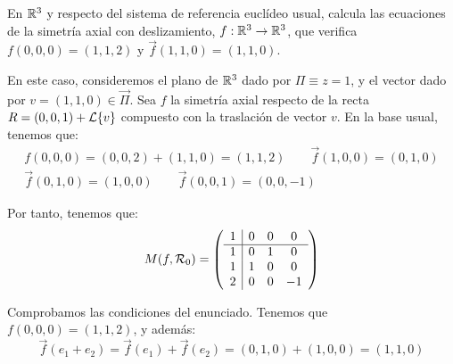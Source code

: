 \documentclass[12pt]{article}
\begin{document}
    \begin{ejercicio}[2.5 puntos] En $\mathbb{R}^3$ y respecto del sistema de referencia euclídeo usual, calcula las ecuaciones
        de la simetría axial con deslizamiento, $f:\mathbb{R}^3 \to \mathbb{R}^3$, que verifica $f(0,0,0)=(1,1,2)$ y $\vec{f}(1,1,0)=(1,1,0)$.

        En este caso, consideremos el plano de $\mathbb{R}^3$ dado por $\Pi\equiv z=1$, y el vector dado por $v=(1,1,0)\in \vec{\Pi}$.
        Sea $f$ la simetría axial respecto de la recta $R=(0,0,1) + \mathcal{L}\{v\}$ compuesto con la traslación de vector $v$.
        En la base usual, tenemos que:
        \begin{gather*}
            f(0,0,0)=(0,0,2) + (1,1,0) = (1,1,2) \qquad
            \vec{f}(1,0,0) = (0,1,0) \\
            \vec{f}(0,1,0) = (1,0,0) \qquad
            \vec{f}(0,0,1) = (0,0,-1)
        \end{gather*}

        Por tanto, tenemos que:
        \begin{equation*}
            M(f, \mathcal{R}_0) = \left(
                \begin{array}{c|ccc}
                    1 & 0 & 0 & 0 \\
                    \hline
                    1 & 0 & 1 & 0 \\
                    1 & 1 & 0 & 0 \\
                    2 & 0 & 0 & -1
                \end{array}
            \right)
        \end{equation*}

        Comprobamos las condiciones del enunciado. Tenemos que $f(0,0,0)=(1,1,2)$, y además:
        \begin{equation*}
            \vec{f}(e_1+e_2) = \vec{f}(e_1) + \vec{f}(e_2) = (0,1,0) + (1,0,0) = (1,1,0)
        \end{equation*}
        
    \end{ejercicio}
\end{document}
